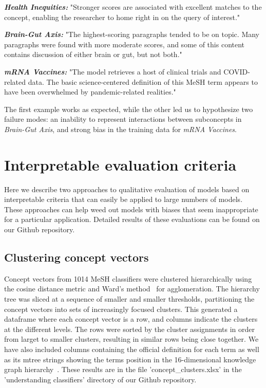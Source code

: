 \documentclass[letterpaper]{article} %
\begin{document}
\noindent \textbf{\textit{Health Inequities:}} "Stronger scores are associated with excellent matches to the concept, enabling the researcher to home right in on the query of interest."

\noindent \textbf{\textit{Brain-Gut Axis:}} "The highest-scoring paragraphs tended to be on topic. Many paragraphs were found with more moderate scores, and some of this content contains discussion of either brain or gut, but not both."

\noindent \textbf{\textit{mRNA Vaccines:}} "The model retrieves a host of clinical trials and COVID-related data. The basic science-centered definition of this MeSH term appears to have been overwhelmed by pandemic-related realities."

The first example works as expected, while the other led us to hypothesize two failure modes: an inability to represent interactions between subconcepts in \textit{Brain-Gut Axis}, and strong bias in the training data for  \textit{mRNA Vaccines}.

\section{Interpretable evaluation criteria}


Here we describe two approaches to qualitative evaluation of models based on interpretable criteria that can easily be applied to large numbers of models.
These approaches can help weed out models with biases that seem inappropriate for a particular application.
Detailed results of these evaluations can be found on our Github repository\cite{PMC_classifiers}.

\subsection{Clustering concept vectors}

Concept vectors from 1014 MeSH classifiers were clustered hierarchically using the cosine distance metric and Ward's method~\cite{ward_clustering} for agglomeration. The hierarchy tree was sliced at a sequence of smaller and smaller thresholds, partitioning the concept vectors into sets of increasingly focused clusters. This generated a dataframe where each concept vector is a row, and columns indicate the clusters at the different levels. The rows were sorted by the cluster assignments in order from larget to smaller clusters, resulting in similar rows being close together. We have also included columns containing the official definition for each term as well as its mtree strings showing the terms position in the 16-dimensional knowledge graph hierarchy~\cite{meshtrees}. These results are in the file 'concept\_clusters.xlsx' in the 'understanding classifiers' directory of our Github repository.
\end{document}
